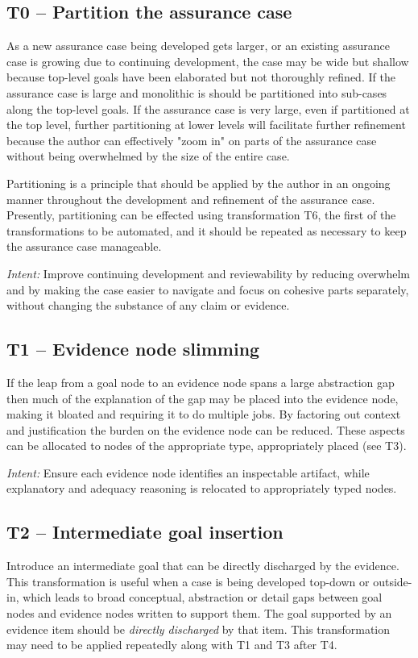 \documentclass{article}
\begin{document}
\subsection{T0 -- Partition the assurance case}
As a new assurance case being developed gets larger, or an existing assurance case is growing due to continuing development, the case may be wide but shallow because top-level goals have been elaborated but not thoroughly refined.
If the assurance case is large and monolithic is should be partitioned into sub-cases along the top-level goals.
If the assurance case is very large, even if partitioned at the top level, further partitioning at lower levels will facilitate further refinement because the author can effectively "zoom in" on parts of the assurance case without being overwhelmed by the size of the entire case.

Partitioning is a principle that should be applied by the author in an ongoing manner throughout the development and refinement of the assurance case.
Presently, partitioning can be effected using transformation T6, the first of the transformations to be automated, and it should be repeated as necessary to keep the assurance case manageable.

\emph{Intent:} Improve continuing development and reviewability by reducing overwhelm and by making the case easier to navigate and focus on cohesive parts separately, without changing the substance of any claim or evidence.

\subsection{T1 -- Evidence node slimming}
If the leap from a goal node to an evidence node spans a large abstraction gap then much of the explanation of the gap may be placed into the evidence node, making it bloated and requiring it to do multiple jobs.
By factoring out context and justification the burden on the evidence node can be reduced.
These aspects can be allocated to nodes of the appropriate type, appropriately placed (see T3).

\emph{Intent:} Ensure each evidence node identifies an inspectable artifact, while explanatory and adequacy reasoning is relocated to appropriately typed nodes.

\subsection{T2 -- Intermediate goal insertion}
Introduce an intermediate goal that can be directly discharged by the evidence.
This transformation is useful when a case is being developed top-down or outside-in, which leads to broad conceptual, abstraction or detail gaps between goal nodes and evidence nodes written to support them.
The goal supported by an evidence item should be \emph{directly discharged} by that item. This transformation may need to be applied repeatedly along with T1 and T3 after T4.
\end{document}
